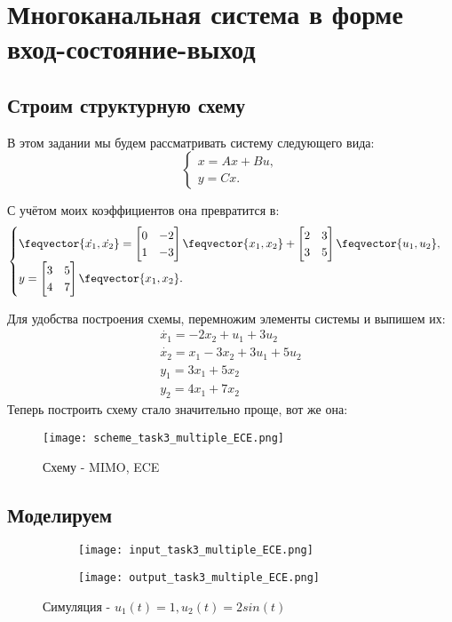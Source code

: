\chapter{Многоканальная система в форме вход-состояние-выход}
\label{ch:chap4}

\section{Строим структурную схему}

В этом задании мы будем рассматривать систему следующего вида: 
 $$
    \begin{cases}
        x =Ax+Bu,\\
        y = Cx.
    \end{cases}
$$

С учётом моих коэффициентов она превратится в:
$$
\begin{cases}
    \feqvector{\dot{x_1},\dot{x_2}} = \begin{bmatrix}
        0 & -2  \\
        1 & -3 
        \end{bmatrix} \feqvector{x_1,x_2} + \begin{bmatrix}
            2 & 3  \\
            3 & 5 
            \end{bmatrix} \feqvector{u_1,u_2},\\
    y = \begin{bmatrix}
        3 & 5  \\
        4 & 7 
        \end{bmatrix} \feqvector{x_1,x_2}.
\end{cases}
$$

Для удобства построения схемы, перемножим элементы системы и выпишем их:
$$
\begin{aligned}
    \dot{x_1} = -2x_2 + u_1 + 3u_2 \\
    \dot{x_2} = x_1 - 3x_2 + 3u_1 +5u_2 \\
    y_1 = 3x_1 +5x_2 \\
    y_2 = 4x_1 + 7x_2
\end{aligned}
$$
Теперь построить схему стало значительно проще, вот же она:
\begin{figure}[ht]
    \centering
    \texttt{[image: scheme\_task3\_multiple\_ECE.png]}
  \caption{Схему - MIMO, ECE}
  \end{figure}

\section{Моделируем}

\begin{figure}[h]
	\begin{subfigure}{0.5\textwidth}
		\texttt{[image: input\_task3\_multiple\_ECE.png]} 
	\end{subfigure}
	\begin{subfigure}{0.5\textwidth}
		\texttt{[image: output\_task3\_multiple\_ECE.png]}
	\end{subfigure}
	\caption{Симуляция - $u_1(t) = 1 , u_2(t) = 2sin(t)$}
\end{figure}

\endinput